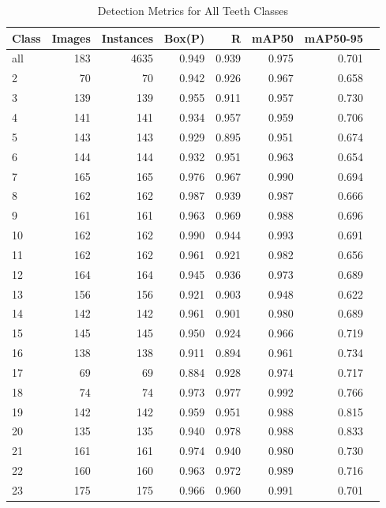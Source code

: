 \documentclass[12pt]{article}
\begin{document}
\begin{table}[htpb]
    \centering
    \caption{Detection Metrics for All Teeth Classes}
    \begin{tabular}{lrrrrrrr}
        \toprule
        \textbf{Class} & \textbf{Images} & \textbf{Instances} & \textbf{Box(P)} & \textbf{R} & \textbf{mAP50} & \textbf{mAP50-95} \\
        \midrule
        all & 183 & 4635 & 0.949 & 0.939 & 0.975 & 0.701 \\
        2 & 70 & 70 & 0.942 & 0.926 & 0.967 & 0.658 \\
        3 & 139 & 139 & 0.955 & 0.911 & 0.957 & 0.730 \\
        4 & 141 & 141 & 0.934 & 0.957 & 0.959 & 0.706 \\
        5 & 143 & 143 & 0.929 & 0.895 & 0.951 & 0.674 \\
        6 & 144 & 144 & 0.932 & 0.951 & 0.963 & 0.654 \\
        7 & 165 & 165 & 0.976 & 0.967 & 0.990 & 0.694 \\
        8 & 162 & 162 & 0.987 & 0.939 & 0.987 & 0.666 \\
        9 & 161 & 161 & 0.963 & 0.969 & 0.988 & 0.696 \\
        10 & 162 & 162 & 0.990 & 0.944 & 0.993 & 0.691 \\
        11 & 162 & 162 & 0.961 & 0.921 & 0.982 & 0.656 \\
        12 & 164 & 164 & 0.945 & 0.936 & 0.973 & 0.689 \\
        13 & 156 & 156 & 0.921 & 0.903 & 0.948 & 0.622 \\
        14 & 142 & 142 & 0.961 & 0.901 & 0.980 & 0.689 \\
        15 & 145 & 145 & 0.950 & 0.924 & 0.966 & 0.719 \\
        16 & 138 & 138 & 0.911 & 0.894 & 0.961 & 0.734 \\
        17 & 69 & 69 & 0.884 & 0.928 & 0.974 & 0.717 \\
        18 & 74 & 74 & 0.973 & 0.977 & 0.992 & 0.766 \\
        19 & 142 & 142 & 0.959 & 0.951 & 0.988 & 0.815 \\
        20 & 135 & 135 & 0.940 & 0.978 & 0.988 & 0.833 \\
        21 & 161 & 161 & 0.974 & 0.940 & 0.980 & 0.730 \\
        22 & 160 & 160 & 0.963 & 0.972 & 0.989 & 0.716 \\
        23 & 175 & 175 & 0.966 & 0.960 & 0.991 & 0.701 \\

\end{tabular}
\end{table}
\end{document}
